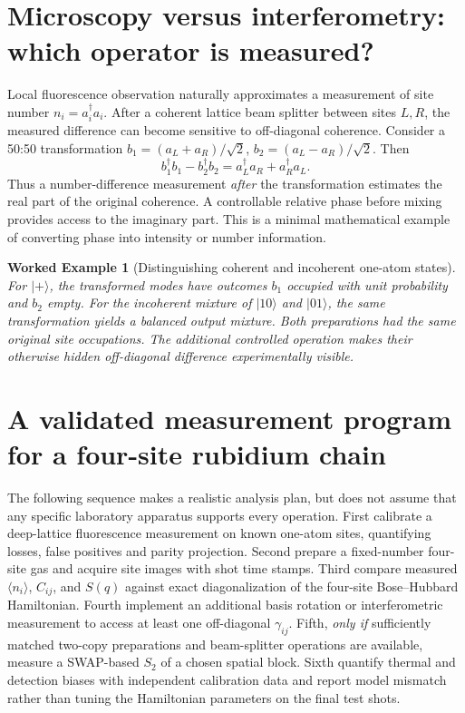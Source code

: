 \documentclass[11pt,a4paper]{article}
\newtheorem{example}{Worked Example}
\begin{document}
\section{Microscopy versus interferometry: which operator is measured?}
Local fluorescence observation naturally approximates a measurement of site number $n_i=a_i^\dagger a_i$. After a coherent lattice beam splitter between sites $L,R$, the measured difference can become sensitive to off-diagonal coherence. Consider a 50:50 transformation $b_1=(a_L+a_R)/\sqrt2$, $b_2=(a_L-a_R)/\sqrt2$. Then
\begin{equation}b_1^\dagger b_1-b_2^\dagger b_2=a_L^\dagger a_R+a_R^\dagger a_L.\end{equation}
Thus a number-difference measurement \emph{after} the transformation estimates the real part of the original coherence. A controllable relative phase before mixing provides access to the imaginary part. This is a minimal mathematical example of converting phase into intensity or number information.
\begin{example}[Distinguishing coherent and incoherent one-atom states]
For $|+\rangle$, the transformed modes have outcomes $b_1$ occupied with unit probability and $b_2$ empty. For the incoherent mixture of $|10\rangle$ and $|01\rangle$, the same transformation yields a balanced output mixture. Both preparations had the same original site occupations. The additional controlled operation makes their otherwise hidden off-diagonal difference experimentally visible.
\end{example}
\section{A validated measurement program for a four-site rubidium chain}
The following sequence makes a realistic analysis plan, but does not assume that any specific laboratory apparatus supports every operation. First calibrate a deep-lattice fluorescence measurement on known one-atom sites, quantifying losses, false positives and parity projection. Second prepare a fixed-number four-site gas and acquire site images with shot time stamps. Third compare measured $\langle n_i\rangle$, $C_{ij}$, and $S(q)$ against exact diagonalization of the four-site Bose--Hubbard Hamiltonian. Fourth implement an additional basis rotation or interferometric measurement to access at least one off-diagonal $\gamma_{ij}$. Fifth, \emph{only if} sufficiently matched two-copy preparations and beam-splitter operations are available, measure a SWAP-based $S_2$ of a chosen spatial block. Sixth quantify thermal and detection biases with independent calibration data and report model mismatch rather than tuning the Hamiltonian parameters on the final test shots.
\end{document}
